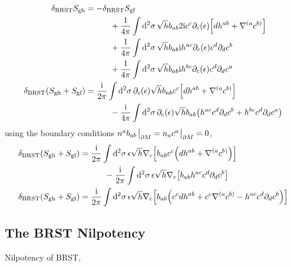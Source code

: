 \begin{align*}
    \delta_{\textnormal{BRST}}S_{\textnormal{gh}}&=-\delta_{\textnormal{BRST}}S_{\textnormal{gf}}\\
    &\quad\quad\quad+\frac{1}{4\pi}\int\dd[2]{\sigma}\sqrt{h}b_{ab}2\textnormal{i} c^c\partial_c\qty(\epsilon) \qty[dh^{ab}+\nabla^{(a}c^{b)}]\\
    &\quad\quad\quad+\frac{1}{4\pi}\int\dd[2]{\sigma}\sqrt{h}b_{ab}\textnormal{i} h^{ac}\partial_c\qty(\epsilon) c^d\partial_dc^b\\
    &\quad\quad\quad+\frac{1}{4\pi}\int\dd[2]{\sigma}\sqrt{h}b_{ab}\textnormal{i} h^{bc}\partial_c\qty(\epsilon) c^d\partial_d c^a\\
    \delta_{\textnormal{BRST}}\qty(S_{\textnormal{gh}}+S_{\textnormal{gf}})&=\frac{\textnormal{i}}{2\pi}\int\dd[2]{\sigma}\partial_c\qty(\epsilon) \sqrt{h}b_{ab}c^c\qty[dh^{ab}+\nabla^{(a}c^{b)}]\\
    &\quad\quad\quad-\frac{\textnormal{i}}{4\pi}\int\dd[2]{\sigma}\partial_c\qty(\epsilon)\sqrt{h}b_{ab}\qty( h^{ac} c^d\partial_dc^b + h^{bc} c^d\partial_d c^a)
\end{align*}
using the boundary conditions $n^ab_{ab}\eval_{\partial M}=n_ac^a\eval_{\partial M}=0$,
\begin{align*}
    \delta_{\textnormal{BRST}}\qty(S_{\textnormal{gh}}+S_{\textnormal{gf}})&=\frac{\textnormal{i}}{2\pi}\int\dd[2]{\sigma}\epsilon\sqrt{h}\nabla_c\qty[b_{ab}c^c\qty(dh^{ab}+\nabla^{(a}c^{b)})]\\
    &\quad\quad\quad-\frac{\textnormal{i}}{2\pi}\int\dd[2]{\sigma}\epsilon\sqrt{h}\nabla_c\qty[b_{ab} h^{ac} c^d\partial_dc^b]\\
    \delta_{\textnormal{BRST}}\qty(S_{\textnormal{gh}}+S_{\textnormal{gf}})&=\frac{\textnormal{i}}{2\pi}\int\dd[2]{\sigma}\epsilon\sqrt{h}\nabla_c\qty[b_{ab}\qty(c^cdh^{ab}+c^c\nabla^{(a}c^{b)}-h^{ac} c^d\partial_dc^b)]
\end{align*}
\subsection{The BRST Nilpotency}

Nilpotency of BRST,

